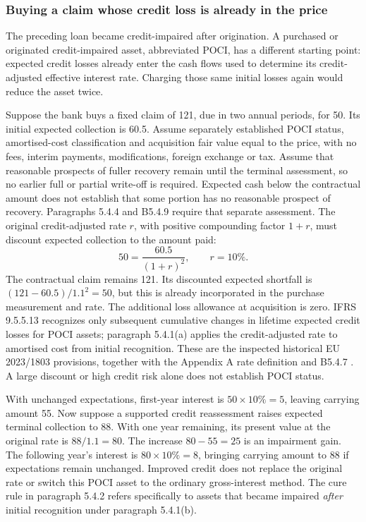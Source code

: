 \subsubsection{Buying a claim whose credit loss is already in the price}
\label{sec:bank-poci-rollforward}

The preceding loan became credit-impaired after origination. A purchased or
originated credit-impaired asset, abbreviated POCI, has a different starting
point: expected credit losses already enter the cash flows used to determine
its credit-adjusted effective interest rate. Charging those same initial losses
again would reduce the asset twice.

Suppose the bank buys a fixed claim of 121, due in two annual periods, for
50. Its initial expected collection is 60.5. Assume separately established
POCI status, amortised-cost classification and acquisition fair value equal to
the price, with no fees, interim payments, modifications, foreign exchange or
tax. Assume that reasonable prospects of fuller recovery remain until the
terminal assessment, so no earlier full or partial write-off is required.
Expected cash below the contractual amount does not establish that some
portion has no reasonable prospect of recovery. Paragraphs 5.4.4 and B5.4.9
require that separate assessment. The original credit-adjusted rate \(r\),
with positive compounding factor \(1+r\), must discount expected
collection to the amount paid:
\[
 50=\frac{60.5}{(1+r)^2},\qquad r=10\%.
\]
The contractual claim remains 121. Its discounted expected shortfall is
\((121-60.5)/1.1^2=50\), but this is already incorporated in the
purchase measurement and rate. The additional loss allowance at acquisition
is zero. IFRS 9.5.5.13 recognizes only subsequent cumulative changes in
lifetime expected credit losses for POCI assets; paragraph 5.4.1(a) applies
the credit-adjusted rate to amortised cost from initial recognition. These
are the inspected historical EU 2023/1803 provisions, together with the
Appendix A rate definition and B5.4.7 \citep{eu20231803}. A large discount
or high credit risk alone does not establish POCI status.

With unchanged expectations, first-year interest is \(50\times10\%=5\),
leaving carrying amount 55. Now suppose a supported credit reassessment
raises expected terminal collection to 88. With one year remaining, its
present value at the original rate is \(88/1.1=80\). The increase
\(80-55=25\) is an impairment gain. The following year's interest is
\(80\times10\%=8\), bringing carrying amount to 88 if expectations
remain unchanged. Improved credit does not replace the original rate or
switch this POCI asset to the ordinary gross-interest method. The cure rule
in paragraph 5.4.2 refers specifically to assets that became impaired
\emph{after} initial recognition under paragraph 5.4.1(b).


